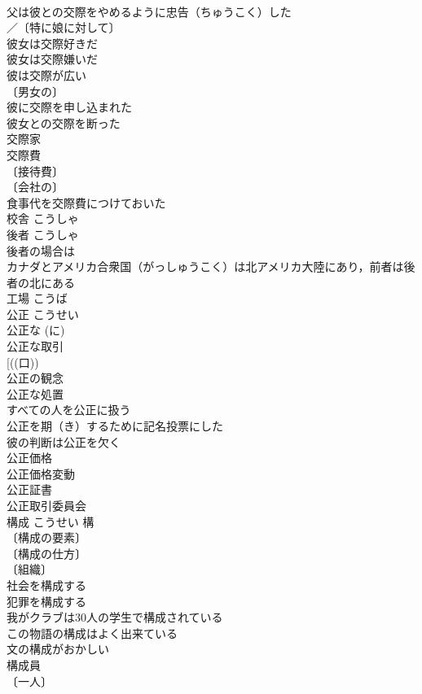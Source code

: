 \documentclass[8pt]{extreport}
\begin{document}
\begin{CJK}{UTF8}{min}
\\	父は彼との交際をやめるように忠告（ちゅうこく）した 
\\	／〔特に娘に対して〕
\\	彼女は交際好きだ 
\\	彼女は交際嫌いだ 
\\	彼は交際が広い 
\\	〔男女の〕
\\	彼に交際を申し込まれた 
\\	彼女との交際を断った 
\\	交際家 
\\	交際費 
\\	〔接待費〕
\\	〔会社の〕
\\	食事代を交際費につけておいた 
\\	校舎	こうしゃ	
\\	後者	こうしゃ	
\\	後者の場合は 
\\	カナダとアメリカ合衆国（がっしゅうこく）は北アメリカ大陸にあり，前者は後者の北にある 
\\	工場	こうば	
\\	公正	こうせい	
\\	公正な (に) 
\\	公正な取引 
\\	[((口))
\\	公正の観念 
\\	公正な処置 
\\	すべての人を公正に扱う 
\\	公正を期（き）するために記名投票にした 
\\	彼の判断は公正を欠く 
\\	公正価格 
\\	公正価格変動 
\\	公正証書 
\\	公正取引委員会 
\\	構成	こうせい	構　
\\	〔構成の要素〕
\\	〔構成の仕方〕
\\	〔組織〕
\\	社会を構成する 
\\	犯罪を構成する 
\\	我がクラブは30人の学生で構成されている 
\\	この物語の構成はよく出来ている 
\\	文の構成がおかしい 
\\	構成員 
\\	〔一人〕

\end{CJK}
\end{document}
